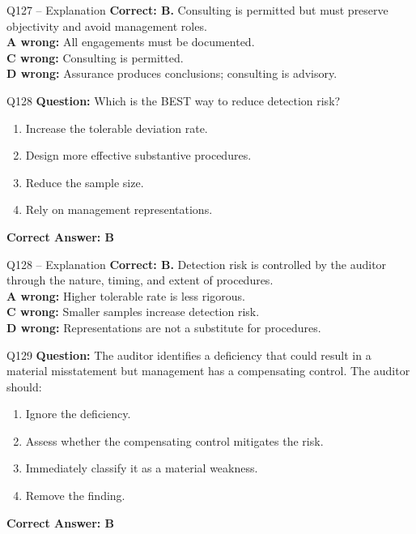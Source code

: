 \documentclass[aspectratio=169,10pt]{beamer}
\begin{document}
	\begin{frame}[t]{Q127 -- Explanation}
		\small
		\textbf{Correct: B.} Consulting is permitted but must preserve objectivity and avoid management roles. \\[4pt]
		\textbf{A wrong:} All engagements must be documented. \\[2pt]
		\textbf{C wrong:} Consulting is permitted. \\[2pt]
		\textbf{D wrong:} Assurance produces conclusions; consulting is advisory.
	\end{frame}
	
	\begin{frame}[t]{Q128}
		\small
		\textbf{Question:} Which is the BEST way to reduce detection risk?
		\begin{enumerate}[label=\Alph*.,itemsep=1pt,topsep=2pt]
			\item Increase the tolerable deviation rate.
			\item Design more effective substantive procedures.
			\item Reduce the sample size.
			\item Rely on management representations.
		\end{enumerate}
		\vspace{4pt}
		\textbf{Correct Answer: B}
	\end{frame}
	
	\begin{frame}[t]{Q128 -- Explanation}
		\small
		\textbf{Correct: B.} Detection risk is controlled by the auditor through the nature, timing, and extent of procedures. \\[4pt]
		\textbf{A wrong:} Higher tolerable rate is less rigorous. \\[2pt]
		\textbf{C wrong:} Smaller samples increase detection risk. \\[2pt]
		\textbf{D wrong:} Representations are not a substitute for procedures.
	\end{frame}
	
	\begin{frame}[t]{Q129}
		\small
		\textbf{Question:} The auditor identifies a deficiency that could result in a material misstatement but management has a compensating control. The auditor should:
		\begin{enumerate}[label=\Alph*.,itemsep=1pt,topsep=2pt]
			\item Ignore the deficiency.
			\item Assess whether the compensating control mitigates the risk.
			\item Immediately classify it as a material weakness.
			\item Remove the finding.
		\end{enumerate}
		\vspace{4pt}
		\textbf{Correct Answer: B}
	\end{frame}
	
\end{document}
